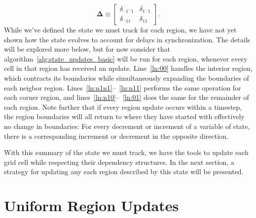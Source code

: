\begin{equation}
  \mathbf{\Delta} \equiv \begin{bmatrix}
    \delta_{^-1^-1} & \delta_{1^-1} \\
    \delta_{^-11} & \delta_{11}
    \end{bmatrix}.
    \label{eq:D}
\end{equation}
While we've defined the state we must track for each region,
we have not yet shown how the state evolves to account for delays in synchronization.
The details will be explored more
  below, but for now consider that algorithm~\ref{alg:state_updates_basic} will
 be run for each region, whenever every cell in that region has received an update.
 Line~\ref{ln:00} handles the interior region, which contracts its boundaries
 while simultaneously expanding the boundaries of each neigbor region.
 Lines~\ref{ln:n1n1}--~\ref{ln:n11} performs the same operation for each corner
 region, and lines~\ref{ln:n10}--~\ref{ln:01} does the same for the remainder of
 each region.  Note further that if every region update occurs within a
 timestep, the region boundaries will all return to where they have started with
 effectively no change in boundaries:  For every decrement or increment of a
 variable of state, there is a corresponding increment or decrement
 in the opposite direction.

 With this summary of the state we must track, we have the
tools to update each grid cell while respecting their dependency structures.
In the next section, a strategy for updating any each region described
by this state will be presented.

\section{Uniform Region Updates}

